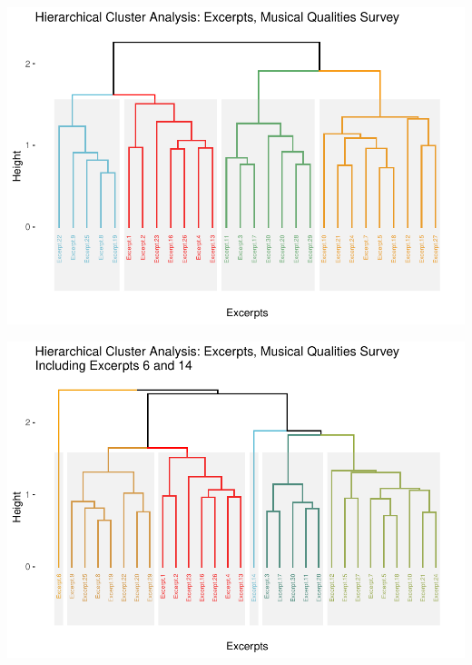 \documentclass[
]{article}
\begin{document}
\begin{center}\includegraphics{MusDes_Supplementary_files/figure-latex/HCA-1} \end{center}

\begin{center}\includegraphics{MusDes_Supplementary_files/figure-latex/HCAW6-1} \end{center}
\end{document}
